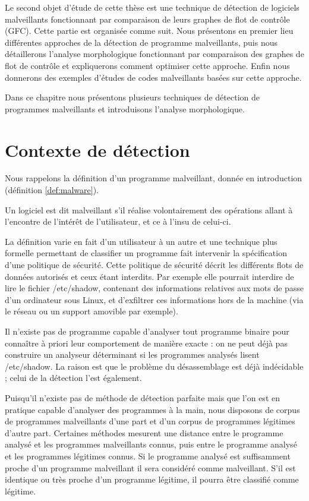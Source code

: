 Le second objet d'étude de cette thèse est une technique de détection de logiciels malveillants fonctionnant par comparaison de leurs graphes de flot de contrôle (GFC).
Cette partie est organisée comme suit. Nous présentons en premier lieu différentes approches de la détection de programme malveillants, puis nous détaillerons l'analyse morphologique fonctionnant par comparaison des graphes de flot de contrôle et expliquerons comment optimiser cette approche. Enfin nous donnerons des exemples d'études de codes malveillants basées sur cette approche.

Dans ce chapitre nous présentons plusieurs techniques de détection de programmes malveillants et introduisons l'analyse morphologique.

\section{Contexte de détection}
Nous rappelons la définition d'un programme malveillant, donnée en introduction (définition \ref{def:malware}).

\begin{defi}
Un logiciel est dit malveillant s'il réalise volontairement des opérations allant à l'encontre de l'intérêt de l'utilisateur, et ce à l'insu de celui-ci.
\label{def:malware}
\end{defi}

La définition varie en fait d'un utilisateur à un autre et une technique plus formelle permettant de classifier un programme fait intervenir la spécification d'une politique de sécurité. 
Cette politique de sécurité décrit les différents flots de données autorisés et ceux étant interdits. Par exemple elle pourrait interdire de lire le fichier /etc/shadow, contenant des informations relatives aux mots de passe d'un ordinateur sous Linux, et d'exfiltrer ces informations hors de la machine (via le réseau ou un support amovible par exemple).

Il n'existe pas de programme capable d'analyser tout programme binaire pour connaître à priori leur comportement de manière exacte : on ne peut déjà pas construire un analyseur déterminant si les programmes analysés lisent /etc/shadow.
La raison est que le problème du désassemblage est déjà indécidable ; celui de la détection l'est également.

Puisqu'il n'existe pas de méthode de détection parfaite mais que l'on est en pratique capable d'analyser des programmes à la main, nous disposons de corpus de programmes malveillants d'une part et d'un corpus de programmes légitimes d'autre part.
Certaines méthodes mesurent une distance entre le programme analysé et les programmes malveillants connus, puis entre le programme analysé et les programmes légitimes connus. Si le programme analysé est suffisamment proche d'un programme malveillant il sera considéré comme malveillant. S'il est identique ou très proche d'un programme légitime, il pourra être classifié comme légitime.

